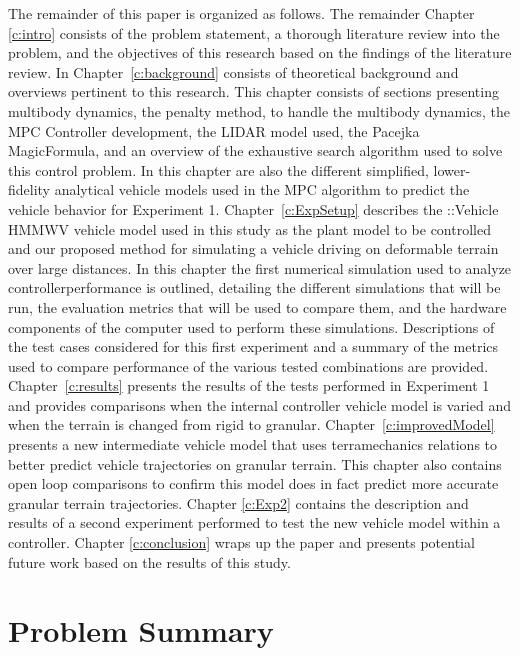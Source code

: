 \documentclass[12pt,onecolumn]{report}
\newcommand{\CHRONO}{{\sffamily{{Chrono}}}}
\newcommand{\ChronoVehicle}{{\sffamily{Chrono}}::Vehicle}
\begin{document}
The remainder of this paper is organized as follows. The remainder Chapter \ref{c:intro} consists of the problem statement, a thorough literature review into the problem, and the objectives of this research based on the findings of the literature review. In Chapter~\ref{c:background} consists of theoretical background and overviews pertinent to this research. This chapter consists of sections presenting multibody dynamics, the penalty method, {\CHRONO} to handle the multibody dynamics, the MPC Controller development, the LIDAR model used, the Pacejka MagicFormula, and an overview of the exhaustive search algorithm used to solve this control problem. In this chapter are also the different simplified, lower-fidelity analytical vehicle models used in the MPC algorithm to predict the {\CHRONO} vehicle behavior for Experiment 1. Chapter~\ref{c:ExpSetup} describes the {\ChronoVehicle} HMMWV vehicle model used in this study as the plant model to be controlled and our proposed method for simulating a vehicle driving on deformable terrain over large distances. In this chapter the first numerical simulation used to analyze controllerperformance is outlined, detailing the different simulations that will be run, the evaluation metrics that will be used to compare them, and the hardware components of the computer used to perform these simulations. Descriptions of the test cases considered for this first experiment and a summary of the metrics used to compare performance of the various tested combinations are provided. Chapter~\ref{c:results} presents the results of the tests performed in Experiment 1 and provides comparisons when the internal controller vehicle model is varied and when the terrain is changed from rigid to granular. Chapter~\ref{c:improvedModel} presents a new intermediate vehicle model that uses terramechanics relations to better predict vehicle trajectories on granular terrain. This chapter also contains open loop comparisons to confirm this model does in fact predict more accurate granular terrain trajectories. Chapter \ref{c:Exp2} contains the description and results of a second experiment performed to test the new vehicle model within a controller. Chapter \ref{c:conclusion} wraps up the paper and presents potential future work based on the results of this study.


\section{Problem Summary}\label{s:ProblemSummary}
\end{document}
